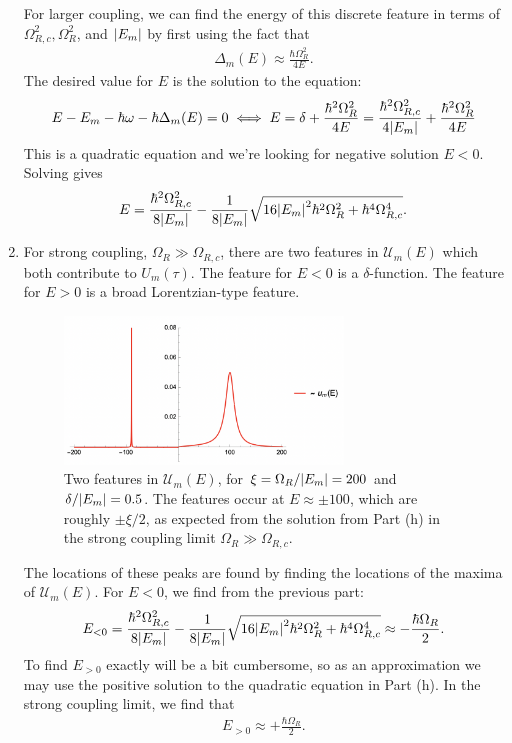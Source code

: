\documentclass{article}
\theoremstyle{definition}
\newcommand{\f}[2]{\frac{#1}{#2}}
\begin{document}
\begin{enumerate}[label=(\alph*)]
For larger coupling, we can find the energy of this discrete feature in terms of $\Omega_{R,c}^2, \Omega_{R}^2$, and $\abs{E_m}$ by first using the fact that 
\begin{align*}
\Delta_m(E) \approx \f{\hbar \Omega_R^2}{4E}. 
\end{align*}
The desired value for $E$ is the solution to the equation:
\begin{align*}
E - E_m - \hbar \omega - \hbar \Delta_m(E) = 0 \iff 
E = \delta + \f{\hbar^2 \Omega_R^2}{4{E}} = \f{\hbar^2 \Omega_{R,c}^2}{4\abs{E_m}} + \f{\hbar^2 \Omega_R^2}{4{E}}
\end{align*}
This is a quadratic equation and we're looking for negative solution $E<0$. Solving gives
\begin{align*}
E = \f{ \hbar^2 \Omega_{R,c}^2}{8 \abs{E_m}} - \f{1}{8\abs{E_m}}\sqrt{ 16\abs{E_m}^2 \hbar^2 \Omega_R^2 + \hbar^4 \Omega_{R,c}^4 }.
\end{align*}

\item For strong coupling, $\Omega_R \gg \Omega_{R,c}$, there are two features in $\mathcal{U}_m(E)$ which both contribute to $U_m(\tau)$. The feature for $E<0$ is a $\delta$-function. The feature for $E>0$ is a broad Lorentzian-type feature. 

\begin{figure}[!htb]
\centering
\includegraphics[width=0.7\textwidth]{two_peaks_newest.png}
\caption{Two features in $\mathcal{U}_m(E)$, for $\xi = \Omega_R / \abs{E_m} = 200$ and $\delta/\abs{E_m} = 0.5$. The features occur at $E \approx \pm 100$, which are roughly $\pm\xi/2$, as expected from the solution from Part (h) in the strong coupling limit $\Omega_R \gg \Omega_{R,c}$.}
\end{figure}

The locations of these peaks are found by finding the locations of the maxima of $\mathcal{U}_m(E)$. For $E<0$, we find from the previous part:
\begin{align*}
E_{<0} = \f{ \hbar^2 \Omega_{R,c}^2}{8 \abs{E_m}} - \f{1}{8\abs{E_m}}\sqrt{ 16\abs{E_m}^2 \hbar^2 \Omega_R^2 + \hbar^4 \Omega_{R,c}^4 } \approx - \f{\hbar \Omega_R}{2}.
\end{align*}
To find $E_{>0}$ exactly will be a bit cumbersome, so as an approximation we may use the positive solution to the quadratic equation in Part (h). In the strong coupling limit, we find that
\begin{align*}
E_{>0} \approx +\f{\hbar \Omega_R}{2}.
\end{align*}


\end{enumerate}
\end{document}
